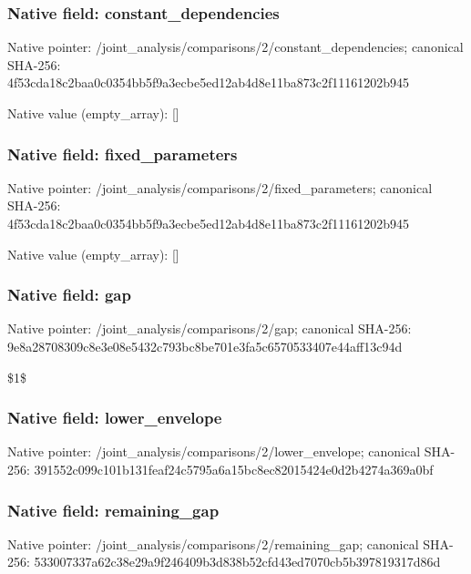 \documentclass[10pt,a4paper]{article}
\begin{document}
\subsubsection{Native field: constant\_\allowbreak{}dependencies}
Native pointer: /joint\_\allowbreak{}analysis/comparisons/2/constant\_\allowbreak{}dependencies; canonical SHA-256: 4f53cda18c2baa0c0354bb5f9a3ecbe5ed12ab4d8e11ba873c2f11161202b945

Native value (empty\_\allowbreak{}array): []

\subsubsection{Native field: fixed\_\allowbreak{}parameters}
Native pointer: /joint\_\allowbreak{}analysis/comparisons/2/fixed\_\allowbreak{}parameters; canonical SHA-256: 4f53cda18c2baa0c0354bb5f9a3ecbe5ed12ab4d8e11ba873c2f11161202b945

Native value (empty\_\allowbreak{}array): []

\subsubsection{Native field: gap}
Native pointer: /joint\_\allowbreak{}analysis/comparisons/2/gap; canonical SHA-256: 9e8a28708309c8e3e08e5432c793bc8be701e3fa5c6570533407e44aff13c94d

\begingroup\raggedright\sloppy \$1\$\par\endgroup

\subsubsection{Native field: lower\_\allowbreak{}envelope}
Native pointer: /joint\_\allowbreak{}analysis/comparisons/2/lower\_\allowbreak{}envelope; canonical SHA-256: 391552c099c101b131feaf24c5795a6a15bc8ec82015424e0d2b4274a369a0bf

\begingroup\raggedright{}\par\endgroup

\subsubsection{Native field: remaining\_\allowbreak{}gap}
Native pointer: /joint\_\allowbreak{}analysis/comparisons/2/remaining\_\allowbreak{}gap; canonical SHA-256: 533007337a62c38e29a9f246409b3d838b52cfd43ed7070cb5b397819317d86d
\end{document}
